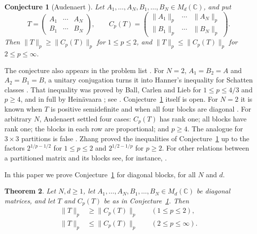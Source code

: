 \documentclass[11pt]{amsart}
\newtheorem{theorem}{Theorem}[section]
\newtheorem{conjecture}[theorem]{Conjecture}
\theoremstyle{definition}
\theoremstyle{remark}
\numberwithin{equation}{section}
\newcommand{\C}{\mathbb{C}}
\begin{document}
\begin{conjecture}[Audenaert {\cite[Conjecture~1]{Aud08}}]\label{conj:A}
Let $A_1,\dots,A_N,B_1,\dots,B_N\in M_d(\C)$, and put
\[
T=\begin{pmatrix}A_1&\cdots&A_N\\ B_1&\cdots&B_N\end{pmatrix},\qquad
C_p(T)=\begin{pmatrix}\|A_1\|_p&\cdots&\|A_N\|_p\\ \|B_1\|_p&\cdots&\|B_N\|_p\end{pmatrix}.
\]
Then $\|T\|_p\ge\|C_p(T)\|_p$ for $1\le p\le2$, and $\|T\|_p\le\|C_p(T)\|_p$ for $2\le p\le\infty$.
\end{conjecture}

The conjecture also appears in the problem list \cite[Section~5, Conjecture~3]{AK17}. For $N=2$, $A_1=B_2=A$ and $A_2=B_1=B$, a unitary conjugation turns it into Hanner's inequality for Schatten classes \cite{Aud08}. That inequality was proved by Ball, Carlen and Lieb \cite{BCL94} for $1\le p\le 4/3$ and $p\ge 4$, and in full by Hein\"avaara \cite{Hei25}; see \cite[Theorem~1.3]{Zha26}. Conjecture~\ref{conj:A} itself is open. For $N=2$ it is known when $T$ is positive semidefinite \cite{Kin03} and when all four blocks are diagonal \cite[Theorem~1]{KN04}. For arbitrary $N$, Audenaert \cite[Section~4]{Aud08} settled four cases: $C_p(T)$ has rank one; all blocks have rank one; the blocks in each row are proportional; and $p\ge 4$. The analogue for $3\times 3$ partitions is false \cite[Section~5]{Aud08}. Zhang \cite[Corollary~1.16]{Zha26} proved the inequalities of Conjecture~\ref{conj:A} up to the factors $2^{1/p-1/2}$ for $1\le p\le2$ and $2^{1/2-1/p}$ for $p\ge2$. For other relations between a partitioned matrix and its blocks see, for instance, \cite{BK90,BL24}.

In this paper we prove Conjecture~\ref{conj:A} for diagonal blocks, for all $N$ and $d$.

\begin{theorem}\label{thm:main}
Let $N,d\ge1$, let $A_1,\dots,A_N,B_1,\dots,B_N\in M_d(\C)$ be diagonal matrices, and let $T$ and $C_p(T)$ be as in Conjecture~\ref{conj:A}. Then
\begin{align}
\|T\|_p&\ge\|C_p(T)\|_p\qquad(1\le p\le2),\label{eq:lower}\\
\|T\|_p&\le\|C_p(T)\|_p\qquad(2\le p\le\infty).\label{eq:upper}
\end{align}
\end{theorem}
\end{document}

